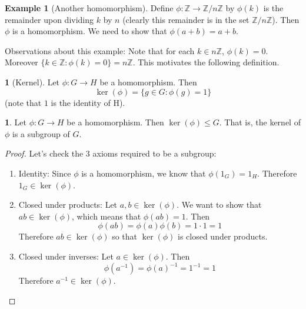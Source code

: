 \documentclass[12pt]{article}
\theoremstyle{definition}
\newtheorem{definition}{\color{NavyBlue}{\textbf{Definition}}}
\newtheorem{theorem}{\color{ForestGreen}{\textbf{Theorem}}}
\newtheorem{example}{\color{WildStrawberry}Example}
\theoremstyle{definition}
\begin{document}
\begin{example}[Another homomorphism]
Define $\phi : \mathbb{Z} \to \mathbb{Z} / n \mathbb{Z}$ by $\phi(k)$ is the remainder upon dividing $k$ by $n$ (clearly this remainder is in the set $\mathbb{Z} / n \mathbb{Z}$). Then $\phi$ is a homomorphism. We need to show that $\phi(a + b) = a + b$.  

Observations about this example: Note that for each $k \in n \mathbb{Z}$, $\phi(k) = 0$. Moreover $\{ k \in \mathbb{Z} : \phi(k) = 0 \} = n \mathbb{Z}$. This motivates the following definition.
\end{example}

\begin{definition}[Kernel]
Let $\phi:G \to H$ be a homomorphism. Then
\begin{equation}
	\ker(\phi) = \{g \in G : \phi(g) = 1 \}
\end{equation}
(note that $1$ is the identity of H).
\end{definition}

\begin{theorem}
Let $\phi: G \to H$ be a homomorphism. Then $\ker(\phi) \leq G$. That is, the kernel of $\phi$ is a subgroup of $G$.
\end{theorem}
\begin{proof}
Let's check the 3 axioms required to be a subgroup:
\begin{enumerate}
	\item Identity: Since $\phi$ is a homomorphism, we know that $\phi(1_G) = 1_H$. Therefore $1_G \in \ker(\phi)$.
	\item Closed under products: Let $a,b \in \ker(\phi)$. We want to show that $ab \in \ker(\phi)$, which means that $\phi(ab) = 1$. Then
	\begin{equation}
		\phi(ab) = \phi(a) \phi(b) = 1 \cdot 1 = 1
	\end{equation}
	Therefore $ab \in \ker(\phi)$ so that $\ker(\phi)$ is closed under products. 
	\item Closed under inverses: Let $a \in \ker(\phi)$. Then
	\begin{equation}
		\phi(a^{-1}) = \phi(a)^{-1} = 1^{-1} = 1
	\end{equation}
	Therefore $a^{-1} \in \ker(\phi)$. 
\end{enumerate}
\end{proof}
\end{document}
